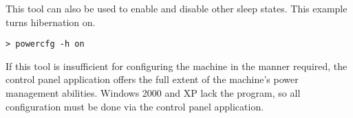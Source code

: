 This tool can also be used to enable and disable other sleep states.
This example turns hibernation on.

\begin{verbatim}
> powercfg -h on
\end{verbatim}

If this tool is insufficient for configuring the machine in the manner required,
the  control panel application offers
the full extent of the machine's power management abilities.
Windows 2000 and XP lack the  program,
so all configuration must be done via the 
control panel application.

